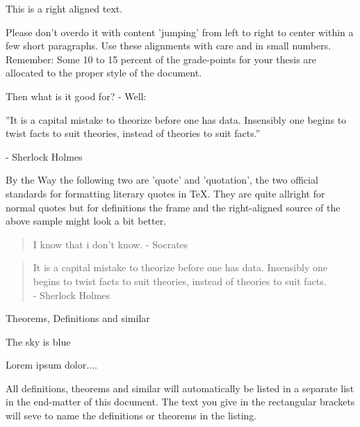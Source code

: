 \documentclass[a4paper, 12pt,oneside]{article}
\begin{document}
\begin{flushright}
This is a right aligned text. 
\end{flushright}

Please don't overdo it with content 'jumping' from left to right to center within a few short paragraphs. Use these alignments with care and in small numbers. \\
Remember: Some 10 to 15 percent of the grade-points for your thesis are allocated to the proper style of the document. 

Then what is it good for? - Well:

\begin{framed}
\begin{flushleft}
''It is a capital mistake to theorize before one has data. Insensibly one begins to twist facts to suit theories, instead of theories to suit facts.''
\end{flushleft}
\begin{flushright}
- Sherlock Holmes
\end{flushright}
\end{framed}

By the Way the following two are 'quote' and 'quotation', the two official standards for formatting literary quotes in \TeX. They are quite allright for normal quotes but for definitions the frame and the right-aligned source of the above sample might look a bit better. 

\begin{quote}
I know that i don't know. - Socrates
\end{quote}

\begin{quotation}
It is a capital mistake to theorize before one has data. Insensibly one begins to twist facts to suit theories, instead of theories to suit facts. \\- Sherlock Holmes
\end{quotation}



Theorems, Definitions and similar


\begin{definition}
The sky is blue
\end{definition}


\begin{theorem}[Lorem]
Lorem ipsum dolor....
\end{theorem}

All definitions, theorems and similar will automatically be listed in a separate list in the end-matter of this document. The text you give in the rectangular brackets will seve to name the definitions or theorems in the listing. 
\end{document}
